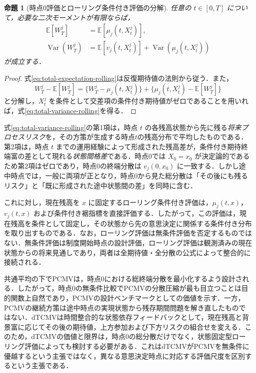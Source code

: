 \documentclass[10pt,a4paper]{article}
\theoremstyle{plain}
\newtheorem{proposition}{命題}
\theoremstyle{definition}
\newcommand{\E}{\mathbb{E}}
\DeclareMathOperator{\Var}{Var}
\begin{document}
\begin{proposition}[時点0評価とローリング条件付き評価の分解]
\label{prop:total-variance-rolling}
任意の $t\in[0,T]$ について，必要な二次モーメントが有限ならば，
\begin{align}
  \E[W_T^j]
  &=\E\!\left[\mu_j(t,X_t^j)\right],
  \label{eq:total-expectation-rolling}\\
  \Var(W_T^j)
  &=\E\!\left[v_j(t,X_t^j)\right]
    +\Var\!\left(\mu_j(t,X_t^j)\right)
  \label{eq:total-variance-rolling}
\end{align}
が成立する．
\end{proposition}

\begin{proof}
式\eqref{eq:total-expectation-rolling}は反復期待値の法則から従う．また，
\[
 W_T^j-\E[W_T^j]
 =\{W_T^j-\mu_j(t,X_t^j)\}
  +\{\mu_j(t,X_t^j)-\E[W_T^j]\}
\]
と分解し，$X_t^j$ を条件として交差項の条件付き期待値がゼロであることを用いれば，式\eqref{eq:total-variance-rolling}を得る．
\end{proof}

式\eqref{eq:total-variance-rolling}の第1項は，時点 $t$ の各残高状態から先に残る\emph{将来プロセスリスク}を，その方策が生成する時点$t$の残高分布で平均したものである．第2項は，時点 $t$ までの運用経験によって形成された残高差が，条件付き期待終端富の差として現れる\emph{状態間格差}である．時点0では $X_0=x_0$ が決定論的であるため第2項はゼロであり，時点0の終端分散は $v_j(0,x_0)$ に一致する．しかし途中時点では，一般に両項が正となり，時点0から見た総分散は「その後にも残るリスク」と「既に形成された途中状態間の差」を同時に含む．

これに対し，現在残高を $x$ に固定するローリング条件付き評価は，$\mu_j(t,x)$，$v_j(t,x)$ および条件付き裾指標を直接評価する．したがって，この評価は，現在残高を条件として固定し，その状態から先の意思決定に関係する条件付き分布を取り出すものである．なお，ローリング評価は無条件評価を否定するものではない．無条件評価は制度開始時点の設計評価，ローリング評価は観測済みの現在状態からの将来見通しであり，両者は全期待値・全分散の公式によって整合的に接続される．

共通平均の下でPCMVは，時点0における総終端分散を最小化するよう設計される．したがって，時点0の無条件比較でPCMVの分散圧縮が最も目立つことは目的関数上自然であり，PCMVの設計ベンチマークとしての価値を示す．一方，PCMVの継続方策は途中時点の実現状態から残存期間問題を解き直したものではない．dTCMVは時間整合的な状態依存フィードバックとして，現在残高と背景富に応じてその後の期待値，上方参加および下方リスクの組合せを変える．このため，dTCMVの価値と限界は，時点0の総分散だけでなく，状態固定型ローリング評価によっても検討する必要がある．これはdTCMVがPCMVを無条件に優越するという主張ではなく，異なる意思決定時点に対応する評価尺度を区別するという主張である．
\end{document}
